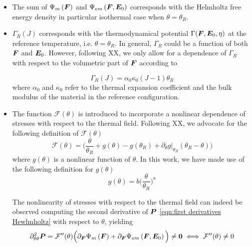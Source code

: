 \begin{itemize}
	\item The sum of ${\Psi}_{m}\left(\boldsymbol{F}\right)$ and ${\Psi}_{em}\left(\boldsymbol{F},\boldsymbol{E}_0\right)$ corresponds with the Helmholtz free energy density in particular isothermal case when $\theta=\theta_R$.
	
	
	\item $\Gamma_R(J)$ corresponds with the thermodynamical potential $\Gamma(\boldsymbol{F},\boldsymbol{E}_0,\eta)$ at the reference temperature, i.e. $\theta=\theta_R$. In general, $\Gamma_R$ could be a function of both $\boldsymbol{F}$ and $\boldsymbol{E}_0$. However, following XX, we only allow for a dependence of $\Gamma_R$ with respect to the volumetric part of $\boldsymbol{F}$ according to
	
	\begin{equation}
	\Gamma_R(J)  =  \alpha_0 \kappa_0 (J-1) \theta_R
	\end{equation}
	where $\alpha_0$ and $\kappa_0$ refer to the thermal expansion coefficient and the bulk modulus of the material in the reference configuration. 
	

\item The function $\mathcal{F}(\theta)$ is introduced to incorporate a nonlinear dependence of stresses with respect to the thermal field. Following XX, we advocate for the following definition of $\mathcal{F}(\theta)$
%
\begin{equation}\label{eqn:F function}
\mathcal{F}(\theta)=\Bigg(\frac{\theta}{\theta_R}+g(\theta) -g(\theta_R) + \left.\partial_{\theta}g\right\vert_{\theta_R}(\theta_R - \theta)\Bigg)
\end{equation}
%
where $g(\theta)$ is a nonlinear function of $\theta$. In this work, we have made use of the following definition for $g(\theta)$
%
\begin{equation}\label{eqn:theta}
g(\theta)  =  b \Bigg(\frac{\theta}{\theta_R}\Bigg)^a
\end{equation}

The nonlinearity of stresses with respect to the thermal field can indeed be observed computing the second derivative of $\boldsymbol{P}$ \eqref{eqn:first derivatives Hewlmholtz} with respect to $\theta$, yielding
%
\begin{equation}
\partial^2_{\theta\theta}\boldsymbol{P}  =  \mathcal{F}^{\prime\prime}(\theta)\Big(\partial_{\boldsymbol{F}}{\Psi}_{m}\left(\boldsymbol{F}\right)+\partial_{\boldsymbol{F}}{\Psi}_{em}\left(\boldsymbol{F},\boldsymbol{E}_0\right)\Big) \neq \boldsymbol{0}\iff 
\mathcal{F}^{\prime\prime}(\theta) \neq 0
\end{equation}


\end{itemize}
